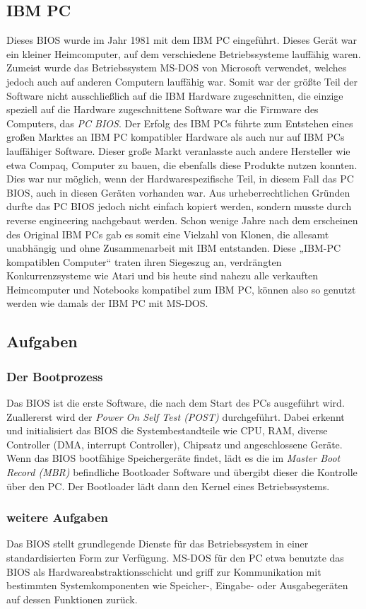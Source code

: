 \documentclass[12pt,ngerman,twopage]{scrartcl}
\begin{document}
\subsection{IBM PC}
Dieses BIOS wurde im Jahr 1981 mit dem IBM PC eingeführt. Dieses Gerät war ein kleiner Heimcomputer, auf dem verschiedene Betriebssysteme lauffähig waren. Zumeist wurde das Betriebssystem MS-DOS von Microsoft verwendet, welches jedoch auch auf anderen Computern lauffähig war. Somit war der größte Teil der Software nicht ausschließlich auf die IBM Hardware zugeschnitten, die einzige speziell auf die Hardware zugeschnittene Software war die Firmware des Computers, das \textit{PC BIOS}.
Der Erfolg des IBM PCs führte zum Entstehen eines großen Marktes an IBM PC kompatibler Hardware als auch nur auf IBM PCs lauffähiger Software. Dieser große Markt veranlasste auch andere Hersteller wie etwa Compaq, Computer zu bauen, die ebenfalls diese Produkte nutzen konnten. Dies war nur möglich, wenn der Hardwarespezifische Teil, in diesem Fall das PC BIOS, auch in diesen Geräten vorhanden war. Aus urheberrechtlichen Gründen durfte das PC BIOS jedoch nicht einfach kopiert werden, sondern musste durch reverse engineering nachgebaut werden. Schon wenige Jahre nach dem erscheinen des Original IBM PCs gab es somit eine Vielzahl von Klonen, die allesamt unabhängig und ohne Zusammenarbeit mit IBM entstanden. Diese „IBM-PC kompatiblen Computer“ traten ihren Siegeszug an, verdrängten Konkurrenzsysteme wie Atari und bis heute sind nahezu alle verkauften Heimcomputer und Notebooks kompatibel zum IBM PC, können also so genutzt werden wie damals der IBM PC mit MS-DOS.
\subsection{Aufgaben}
\subsubsection{Der Bootprozess}
Das BIOS ist die erste Software, die nach dem Start des PCs ausgeführt wird. Zuallererst wird der \textit{Power On Self Test (POST)} durchgeführt. Dabei erkennt und initialisiert das BIOS die Systembestandteile wie CPU, RAM, diverse Controller (DMA, interrupt Controller), Chipsatz und angeschlossene Geräte. Wenn das BIOS bootfähige Speichergeräte findet, lädt es die im \textit{Master Boot Record (MBR)} befindliche Bootloader Software und übergibt dieser die Kontrolle über den PC. Der Bootloader lädt dann den Kernel eines Betriebssystems.
\subsubsection{weitere Aufgaben}
Das BIOS stellt grundlegende Dienste für das Betriebssystem in einer standardisierten Form zur Verfügung. MS-DOS für den PC etwa benutzte das BIOS als Hardwareabstraktionsschicht und griff zur Kommunikation mit bestimmten Systemkomponenten wie Speicher-, Eingabe- oder Ausgabegeräten auf dessen Funktionen zurück.
\end{document}
